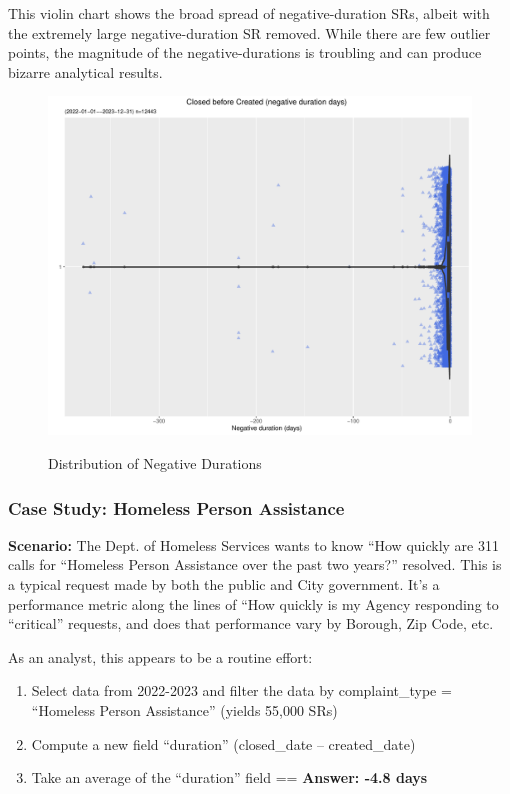 \documentclass[12pt, titlepage]{article}
\begin{document}
{This violin chart shows the broad spread of negative-duration SRs, albeit with the extremely large 
negative-duration SR removed. While there are few outlier points, the magnitude of the negative-durations
is troubling and can produce bizarre analytical results.

\begin{figure}[tbp]
 	 \centering
 	 \caption{Distribution of Negative Durations}
	  \includegraphics[width = \textwidth]{negative_duration_SR_violin.pdf}
	  \label{fig:negative-duration-violin}
\end{figure}


\subsubsection{Case Study: Homeless Person Assistance}
		\textbf{Scenario:} The Dept. of Homeless Services wants to know ``How quickly are 311 calls for ``Homeless Person
		Assistance over the past two years?'' resolved. This is a typical request made by both the public and City government. It's a performance metric along the lines
		of ``How quickly is my Agency responding to ``critical'' requests, and does that performance vary by Borough, Zip Code, etc. 

		As an analyst, this appears to be a routine effort: 
		
		\begin{enumerate}
		    \item Select data from 2022-2023 and filter the data by complaint\_type = ``Homeless Person Assistance'' (yields 55,000 SRs)
		    \item Compute a new field ``duration'' (closed\_date – created\_date)
		    \item Take an average of the ``duration'' field == \textbf{Answer:  -4.8 days}  
		\end{enumerate}
		
}
\end{document}
